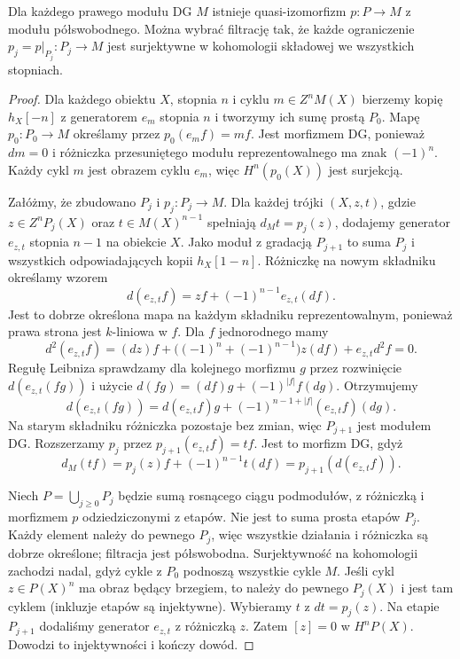 \begin{twierdzenie}\label{cat:thm:dg-semifree-resolution}
Dla każdego prawego modułu DG $M$ istnieje quasi-izomorfizm $p:P\to M$ z modułu półswobodnego. Można wybrać filtrację tak, że każde ograniczenie $p_j=p|_{P_j}:P_j\to M$ jest surjektywne w kohomologii składowej we wszystkich stopniach.
\end{twierdzenie}
\begin{proof}
Dla każdego obiektu $X$, stopnia $n$ i cyklu $m\in Z^nM(X)$ bierzemy kopię $h_X[-n]$ z generatorem $e_m$ stopnia $n$ i tworzymy ich sumę prostą $P_0$. Mapę $p_0:P_0\to M$ określamy przez $p_0(e_m f)=mf$. Jest morfizmem DG, ponieważ $dm=0$ i różniczka przesuniętego modułu reprezentowalnego ma znak $(-1)^n$. Każdy cykl $m$ jest obrazem cyklu $e_m$, więc $H^n(p_0(X))$ jest surjekcją.

Załóżmy, że zbudowano $P_j$ i $p_j:P_j\to M$. Dla każdej trójki $(X,z,t)$, gdzie $z\in Z^nP_j(X)$ oraz $t\in M(X)^{n-1}$ spełniają $d_Mt=p_j(z)$, dodajemy generator $e_{z,t}$ stopnia $n-1$ na obiekcie $X$. Jako moduł z gradacją $P_{j+1}$ to suma $P_j$ i wszystkich odpowiadających kopii $h_X[1-n]$. Różniczkę na nowym składniku określamy wzorem
\[
 d(e_{z,t}f)=zf+(-1)^{n-1}e_{z,t}(df).
\]
Jest to dobrze określona mapa na każdym składniku reprezentowalnym, ponieważ prawa strona jest $k$-liniowa w $f$. Dla $f$ jednorodnego mamy
\[
 d^2(e_{z,t}f)
 = (dz)f+\bigl((-1)^n+(-1)^{n-1}\bigr)z(df)
   + e_{z,t}d^2f=0.
\]
Regułę Leibniza sprawdzamy dla kolejnego morfizmu $g$ przez rozwinięcie $d(e_{z,t}(fg))$ i użycie $d(fg)=(df)g+(-1)^{|f|}f(dg)$. Otrzymujemy
\[
 d(e_{z,t}(fg))=d(e_{z,t}f)g+(-1)^{n-1+|f|}(e_{z,t}f)(dg).
\]
Na starym składniku różniczka pozostaje bez zmian, więc $P_{j+1}$ jest modułem DG. Rozszerzamy $p_j$ przez $p_{j+1}(e_{z,t}f)=tf$. Jest to morfizm DG, gdyż
\[
 d_M(tf)=p_j(z)f+(-1)^{n-1}t(df)
 =p_{j+1}(d(e_{z,t}f)).
\]

Niech $P=\bigcup_{j\geq0}P_j$ będzie sumą rosnącego ciągu podmodułów, z różniczką i morfizmem $p$ odziedziczonymi z etapów. Nie jest to suma prosta etapów $P_j$. Każdy element należy do pewnego $P_j$, więc wszystkie działania i różniczka są dobrze określone; filtracja jest półswobodna. Surjektywność na kohomologii zachodzi nadal, gdyż cykle z $P_0$ podnoszą wszystkie cykle $M$. Jeśli cykl $z\in P(X)^n$ ma obraz będący brzegiem, to należy do pewnego $P_j(X)$ i jest tam cyklem (inkluzje etapów są injektywne). Wybieramy $t$ z $dt=p_j(z)$. Na etapie $P_{j+1}$ dodaliśmy generator $e_{z,t}$ z różniczką $z$. Zatem $[z]=0$ w $H^nP(X)$. Dowodzi to injektywności i kończy dowód.
\end{proof}

